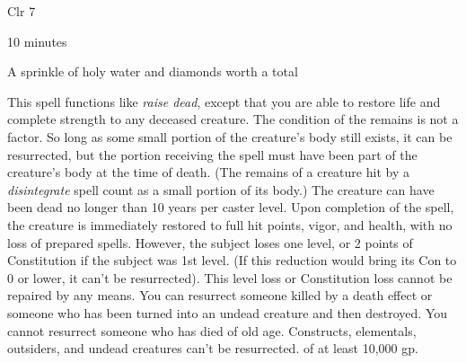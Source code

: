 
\begin{description*}
\item[Level:] Clr 7
\item[Casting Time:] 10 minutes
\item[Arcane Material Component:] A sprinkle of holy water and diamonds worth a total
\end{description*}

This spell functions like \textit{raise dead}, except that you are able to restore
life and complete strength to any deceased creature.
The condition of the remains is not a factor. So long as some small portion of
the creature's body still exists, it can be resurrected, but the portion receiving
the spell must have been part of the creature's body at the time of death. (The
remains of a creature hit by a \textit{disintegrate} spell count as a small portion
of its body.) The creature can have been dead no longer than 10 years per caster
level.
Upon completion of the spell, the creature is immediately restored to full hit
points, vigor, and health, with no loss of prepared spells. However, the subject
loses one level, or 2 points of Constitution if the subject was 1st level. (If
this reduction would bring its Con to 0 or lower, it can't be resurrected). This
level loss or Constitution loss cannot be repaired by any means.
You can resurrect someone killed by a death effect or someone who has been turned
into an undead creature and then destroyed. You cannot resurrect someone who has
died of old age. Constructs, elementals, outsiders, and undead creatures can't
be resurrected.
of at least 10,000 gp.